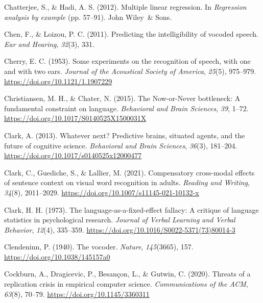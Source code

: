 \documentclass[a4paper, nobind]{templates/ociamthesis}
\newlength{\cslhangindent}
\newenvironment{CSLReferences}[2] %
 {%
  \setlength{\parindent}{0pt}
  \ifodd #1
  \let\oldpar\par
  \def\par{\hangindent=\cslhangindent\oldpar}
  \fi
  \setlength{\parskip}{1mm}
  \setlength{\baselineskip}{6mm}
 }%
 {}
\begin{document}
\begin{CSLReferences}{1}{0}
\leavevmode{}%
Chatterjee, S., \& Hadi, A. S. (2012). Multiple linear regression. In \emph{Regression analysis by example} (pp. 57--91). John Wiley~\& Sons.

\leavevmode{}%
Chen, F., \& Loizou, P. C. (2011). Predicting the intelligibility of vocoded speech. \emph{Ear and Hearing}, \emph{32}(3), 331.

\leavevmode{}%
Cherry, E. C. (1953). {Some experiments on the recognition of speech, with one and with two ears}. \emph{Journal of the Acoustical Society of America}, \emph{25}(5), 975--979. \url{https://doi.org/10.1121/1.1907229}

\leavevmode{}%
Christiansen, M. H., \& Chater, N. (2015). {The Now-or-Never bottleneck: A fundamental constraint on language}. \emph{Behavioral and Brain Sciences}, \emph{39}, 1--72. \url{https://doi.org/10.1017/S0140525X1500031X}

\leavevmode{}%
Clark, A. (2013). Whatever next? Predictive brains, situated agents, and the future of cognitive science. \emph{Behavioral and Brain Sciences}, \emph{36}(3), 181--204. \url{https://doi.org/10.1017/s0140525x12000477}

\leavevmode{}%
Clark, C., Guediche, S., \& Lallier, M. (2021). {Compensatory cross-modal effects of sentence context on visual word recognition in adults}. \emph{Reading and Writing}, \emph{34}(8), 2011--2029. \url{https://doi.org/10.1007/s11145-021-10132-x}

\leavevmode{}%
Clark, H. H. (1973). {The language-as-a-fixed-effect fallacy: A critique of language statistics in psychological research}. \emph{Journal of Verbal Learning and Verbal Behavior}, \emph{12}(4), 335--359. \url{https://doi.org/10.1016/S0022-5371(73)80014-3}

\leavevmode{}%
Clendeninn, P. (1940). {The vocoder}. \emph{Nature}, \emph{145}(3665), 157. \url{https://doi.org/10.1038/145157a0}

\leavevmode{}%
Cockburn, A., Dragicevic, P., Besançon, L., \& Gutwin, C. (2020). {Threats of a replication crisis in empirical computer science}. \emph{Communications of the ACM}, \emph{63}(8), 70--79. \url{https://doi.org/10.1145/3360311}


\end{CSLReferences}
\end{document}
